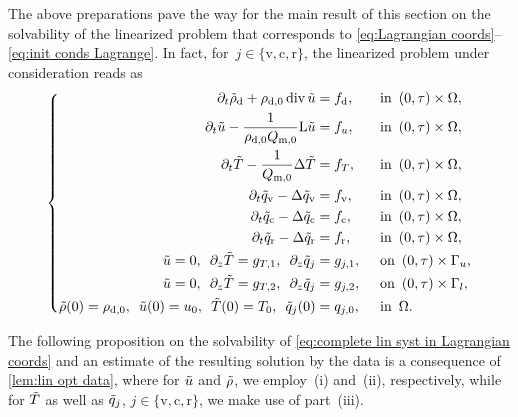 \documentclass[10pt]{amsart}
\theoremstyle{plain}
\theoremstyle{definition}
\theoremstyle{thm}
\numberwithin{equation}{section}
\newcommand{\rL}{\mathrm{L}}
\DeclareMathOperator{\mdiv}{div}
\newcommand{\del}{\partial}
\newcommand{\dz}{\del_z}
\newcommand{\dt}{\del_t}
\newcommand{\Gal}{\Gamma_l}
\newcommand{\Gau}{\Gamma_u}
\newcommand{\ton}{\enspace \text{on} \enspace}
\newcommand{\tin}{\enspace \text{in} \enspace}
\newcommand{\rd}{\mathrm{d}}
\renewcommand{\rm}{\mathrm{m}}
\newcommand{\rr}{\mathrm{r}}
\newcommand{\rv}{\mathrm{v}}
\newcommand{\rc}{\mathrm{c}}
\newcommand{\trho}{\Tilde{\rho}}
\newcommand{\tu}{\Tilde{u}}
\newcommand{\tT}{\Tilde{T}}
\newcommand{\tq}{\Tilde{q}}
\begin{document}
The above preparations pave the way for the main result of this section on the solvability of the linearized problem that corresponds to \eqref{eq:Lagrangian coords}--\eqref{eq:init conds Lagrange}.
In fact, for~$j \in \{\rv,\rc,\rr\}$, the linearized problem under consideration reads as 
\begin{equation}\label{eq:complete lin syst in Lagrangian coords}
    \left\{
    \begin{aligned}
        \dt \trho_\rd + \rho_{\rd,0} \mdiv \tu 
        &=f_\rd, &&\tin (0,\tau) \times \Omega,\\
        \dt \tu - \frac{1}{\rho_{\rd,0} Q_{\rm,0}} \rL \tu 
        &=  f_u, &&\tin (0,\tau) \times \Omega,\\
        \dt \tT - \frac{1}{Q_{\rm,0}} \Delta \tT
        &= f_T, &&\tin (0,\tau) \times \Omega,\\
        \dt \tq_\rv - \Delta \tq_\rv
        &= f_\rv, &&\tin (0,\tau) \times \Omega,\\
        \dt \tq_\rc - \Delta \tq_\rc
        &= f_\rc, &&\tin (0,\tau) \times \Omega,\\
        \dt \tq_\rr - \Delta \tq_\rr
        &= f_\rr, &&\tin (0,\tau) \times \Omega,\\
        \tu = 0, \enspace \dz \tT = g_{T,1}, \enspace \dz \tq_j
        &= g_{j,1}, &&\ton (0,\tau) \times \Gau,\\
        \tu = 0, \enspace \dz \tT = g_{T,2}, \enspace \dz \tq_j
        &= g_{j,2}, &&\ton (0,\tau) \times \Gal,\\
        \trho(0) = \rho_{\rd,0}, \enspace \tu(0) = u_0, \enspace \tT(0) = T_0, \enspace \tq_j(0)
        &= q_{j,0}, &&\tin \Omega.
    \end{aligned}
    \right.
\end{equation}

The following proposition on the solvability of \eqref{eq:complete lin syst in Lagrangian coords} and an estimate of the resulting solution by the data is a consequence of \autoref{lem:lin opt data}, where for $\tu$ and $\trho$, we employ~(i) and~(ii), respectively, while for $\tT$ as well as $\tq_j$, $j \in \{\rv,\rc,\rr\}$, we make use of part~(iii).
\end{document}
